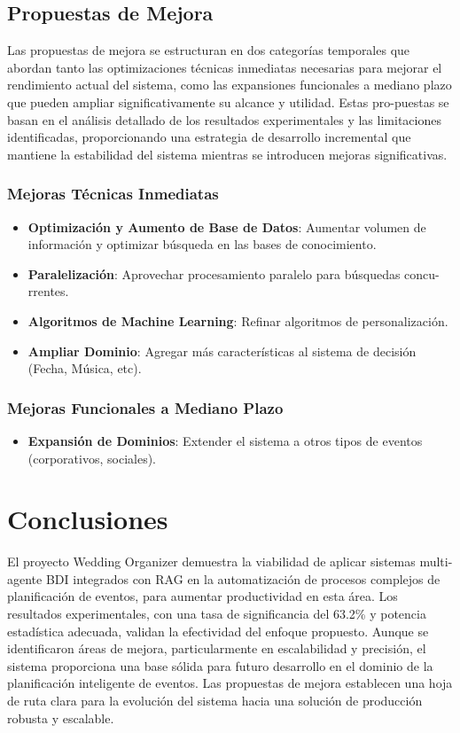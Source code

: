 \documentclass[runningheads,a4paper]{llncs}
\begin{document}
\subsection{Propuestas de Mejora}

Las propuestas de mejora se estructuran en dos categorías temporales que abordan tanto las optimizaciones técnicas inmediatas 
necesarias para mejorar el rendimiento actual del sistema, como las expansiones funcionales a mediano plazo que pueden ampliar 
significativamente su alcance y utilidad. Estas pro-puestas se basan en el análisis detallado de los resultados experimentales 
y las limitaciones identificadas, proporcionando una estrategia de desarrollo incremental que mantiene la estabilidad del 
sistema mientras se introducen mejoras significativas.

\subsubsection{Mejoras Técnicas Inmediatas}
\begin{itemize}
    \item \textbf{Optimización y Aumento de Base de Datos}: Aumentar volumen  de información y optimizar búsqueda en las 
    bases de conocimiento.
    \item \textbf{Paralelización}: Aprovechar procesamiento paralelo para búsquedas concu-rrentes.
    \item \textbf{Algoritmos de Machine Learning}: Refinar algoritmos de personalización.
    \item \textbf{Ampliar Dominio}: Agregar más características al sistema de decisión (Fecha, Música, etc).
\end{itemize}

\subsubsection{Mejoras Funcionales a Mediano Plazo}
\begin{itemize}
    \item \textbf{Expansión de Dominios}: Extender el sistema a otros tipos de eventos (corporativos, sociales).
\end{itemize}


\section{Conclusiones}

El proyecto Wedding Organizer demuestra la viabilidad de aplicar sistemas multi-agente BDI integrados con RAG en la automatización de procesos complejos de planificación de eventos, para aumentar productividad en esta área. Los resultados experimentales, con una tasa de significancia del 63.2\% y potencia estadística adecuada, validan la efectividad del enfoque propuesto.
Aunque se identificaron áreas de mejora, particularmente en escalabilidad y precisión, el sistema proporciona una base sólida para futuro desarrollo en el dominio de la planificación inteligente de eventos. Las propuestas de mejora establecen una hoja de ruta clara para la evolución del sistema hacia una solución de producción robusta y escalable.
\end{document}
